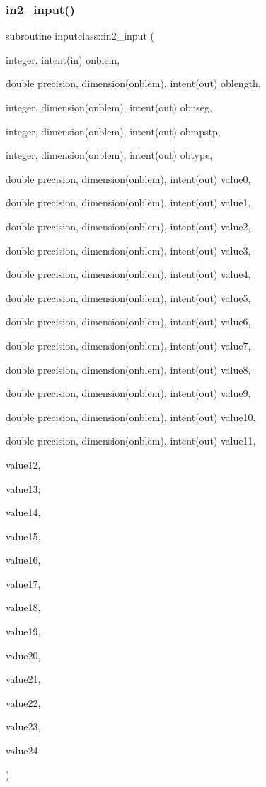 \subsubsection{\texorpdfstring{in2\_input()}{in2\_input()}}
{\footnotesize\ttfamily subroutine inputclass\+::in2\+\_\+input (\begin{DoxyParamCaption}\item[{integer, intent(in)}]{onblem,  }\item[{double precision, dimension(onblem), intent(out)}]{oblength,  }\item[{integer, dimension(onblem), intent(out)}]{obnseg,  }\item[{integer, dimension(onblem), intent(out)}]{obmpstp,  }\item[{integer, dimension(onblem), intent(out)}]{obtype,  }\item[{double precision, dimension(onblem), intent(out)}]{value0,  }\item[{double precision, dimension(onblem), intent(out)}]{value1,  }\item[{double precision, dimension(onblem), intent(out)}]{value2,  }\item[{double precision, dimension(onblem), intent(out)}]{value3,  }\item[{double precision, dimension(onblem), intent(out)}]{value4,  }\item[{double precision, dimension(onblem), intent(out)}]{value5,  }\item[{double precision, dimension(onblem), intent(out)}]{value6,  }\item[{double precision, dimension(onblem), intent(out)}]{value7,  }\item[{double precision, dimension(onblem), intent(out)}]{value8,  }\item[{double precision, dimension(onblem), intent(out)}]{value9,  }\item[{double precision, dimension(onblem), intent(out)}]{value10,  }\item[{double precision, dimension(onblem), intent(out)}]{value11,  }\item[{}]{value12,  }\item[{}]{value13,  }\item[{}]{value14,  }\item[{}]{value15,  }\item[{}]{value16,  }\item[{}]{value17,  }\item[{}]{value18,  }\item[{}]{value19,  }\item[{}]{value20,  }\item[{}]{value21,  }\item[{}]{value22,  }\item[{}]{value23,  }\item[{}]{value24 }\end{DoxyParamCaption})}




